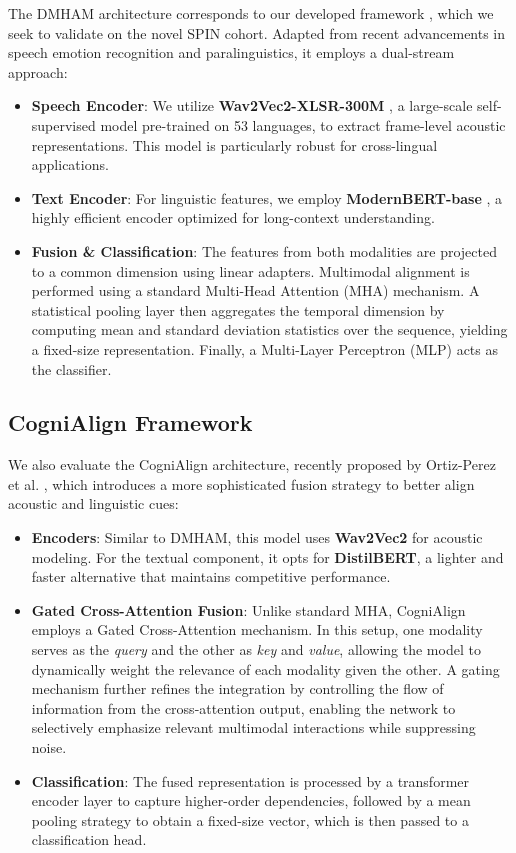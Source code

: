 \documentclass{Odyssey2026}
\begin{document}
The DMHAM architecture corresponds to our developed framework \cite{casals2024attention}, which we seek to validate on the novel SPIN cohort. Adapted from recent advancements in speech emotion recognition and paralinguistics, it employs a dual-stream approach:
\begin{itemize}
    \item \textbf{Speech Encoder}: We utilize \textbf{Wav2Vec2-XLSR-300M} \cite{29}, a large-scale self-supervised model pre-trained on 53 languages, to extract frame-level acoustic representations. This model is particularly robust for cross-lingual applications.
    \item \textbf{Text Encoder}: For linguistic features, we employ \textbf{ModernBERT-base} \cite{32}, a highly efficient encoder optimized for long-context understanding.
    \item \textbf{Fusion \& Classification}: The features from both modalities are projected to a common dimension using linear adapters. Multimodal alignment is performed using a standard Multi-Head Attention (MHA) mechanism. A statistical pooling layer then aggregates the temporal dimension by computing mean and standard deviation statistics over the sequence, yielding a fixed-size representation. Finally, a Multi-Layer Perceptron (MLP) acts as the classifier.
\end{itemize}

\subsection{CogniAlign Framework}

We also evaluate the CogniAlign architecture, recently proposed by Ortiz-Perez et al. \cite{ORTIZPEREZ2025114264}, which introduces a more sophisticated fusion strategy to better align acoustic and linguistic cues:
\begin{itemize}
    \item \textbf{Encoders}: Similar to DMHAM, this model uses \textbf{Wav2Vec2} for acoustic modeling. For the textual component, it opts for \textbf{DistilBERT}, a lighter and faster alternative that maintains competitive performance.
    \item \textbf{Gated Cross-Attention Fusion}: Unlike standard MHA, CogniAlign employs a Gated Cross-Attention mechanism. In this setup, one modality serves as the \textit{query} and the other as \textit{key} and \textit{value}, allowing the model to dynamically weight the relevance of each modality given the other. A gating mechanism further refines the integration by controlling the flow of information from the cross-attention output, enabling the network to selectively emphasize relevant multimodal interactions while suppressing noise.
    \item \textbf{Classification}: The fused representation is processed by a transformer encoder layer to capture higher-order dependencies, followed by a mean pooling strategy to obtain a fixed-size vector, which is then passed to a classification head.
\end{itemize}
\end{document}
